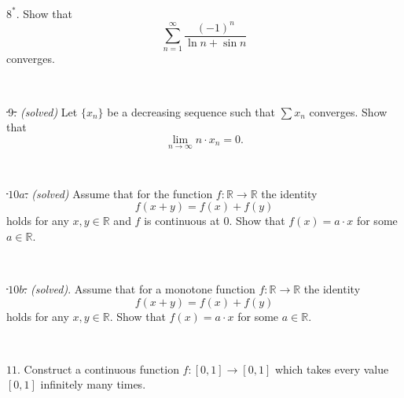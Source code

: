 \documentclass{article}
\def\noi{\noindent}%
\def\RR{\mathbb{R}}%
\begin{document}
\ 

\noi $8^*\!$. Show that 
$$\sum_{n=1}^\infty  \frac{(-1)^n}{\ln n+\sin n}$$ 
converges.

\ 

\noi \sout{\,$9$.} \textit{(solved)}
Let $\{ x_n \}$ be a decreasing sequence such that $\sum x_n$ converges.
Show that 
\[\lim_{n\to\infty} n{\cdot}x_n = 0.\]

\ 

\noi \sout{\,$10a$.} \textit{(solved)}
Assume that for the function $f \colon \RR \to \RR$ the identity
\[f(x+y) = f(x) + f(y)\]
holds for any $x,y\in\RR$ and $f$ is continuous at $0$.
Show that $f(x) = a\cdot x$ for some $a \in \RR$.


\ 

\noi \sout{\,$10b$.} \textit{(solved)}.
Assume that for a monotone function $f \colon \RR \to \RR$ the identity
\[f(x+y) = f(x) + f(y)\]
holds for any $x,y\in\RR$.
Show that $f(x) = a\cdot x$ for some $a \in \RR$.


\ 

\noi $11$. Construct a continuous function $f \colon [0,1] \to [0,1]$ which takes every value $[0,1]$ infinitely many times.
\end{document}

